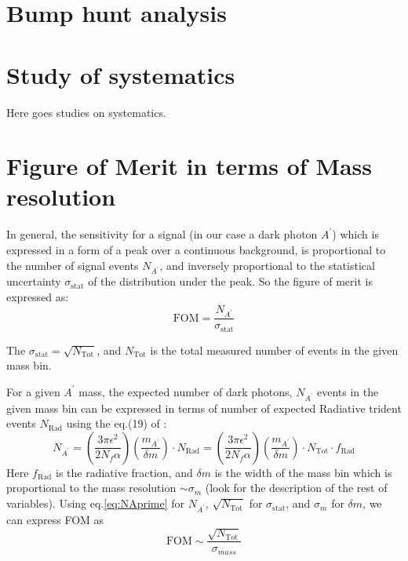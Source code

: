 \documentclass[letterpaper,12pt]{article}
\def \dstl {\displaystyle}
\begin{document}
\section{Bump hunt analysis}


\section{Study of systematics}
Here goes studies on systematics.




\appendix
\appendixpage
\addappheadtotoc
\section{Figure of Merit in terms of Mass resolution}
\label{sec:AppendixFOM}
In general, the sensitivity for a signal (in our case a dark photon $A^{\prime}$) which is expressed in a form of a peak over a continuous background, is proportional to the number of signal events $\dstl N_{A^{\prime}}$, and inversely proportional to the statistical uncertainty $\sigma_{\mathrm{stat}}$ of the distribution under the peak.
So the figure of merit is expressed as:
\begin{equation}
 \mathrm{FOM} = \frac{\dstl N_{A^{\prime}}}{\dstl \sigma_{\mathrm{stat}}}
 \label{eq:FOM_massres}
\end{equation}

The $\sigma_{\mathrm{stat}} = \sqrt{N_{\mathrm{Tot}}}$, and $N_{\mathrm{Tot}}$ is the total measured number of events in the given mass bin.

For a given $A^{\prime}$ mass, the expected number of dark photons, 
$\dstl N_{A^{\prime}}$ events in the given mass bin  can be expressed in terms of number of expected Radiative trident events $N_{\mathrm{Rad}}$ using the eq.(19) of \cite{AprimeFixedTargetTheory}:
\begin{equation}
 N_{A^{\prime}} = \left(\frac{\dstl 3\pi \epsilon^{2}}{\dstl 2 N_{f} \alpha}\right) \left( \frac{\dstl m_{A^{\prime}}}{\delta m} \right)\cdot N_{\mathrm{Rad}} = \left(\frac{\dstl 3\pi \epsilon^{2}}{\dstl 2 N_{f} \alpha}\right) \left( \frac{\dstl m_{A^{\prime}}}{\delta m} \right) \cdot N_{\mathrm{Tot}}\cdot f_{\mathrm{Rad}}
 \label{eq:NAprime}
\end{equation}
Here $f_{\mathrm{Rad}}$ is the radiative fraction, and $\delta m$ is the width of the mass bin which is proportional to the mass resolution $\sim \sigma_{m}$ (look \cite{AprimeFixedTargetTheory} for the description of the rest of variables). 
Using eq.\ref{eq:NAprime} for $N_{A^{\prime}}$, $\dstl\sqrt{N_{\mathrm{Tot}}}$ for 
$\sigma_{\mathrm{stat}}$, and $\dstl \sigma_{m}$ for $\delta m$, we can express FOM as
\begin{equation}
 \mathrm {FOM} \sim \frac{\dstl \sqrt{N_{\mathrm{Tot}}}}{\sigma_{mass}}
\end{equation}
\end{document}
